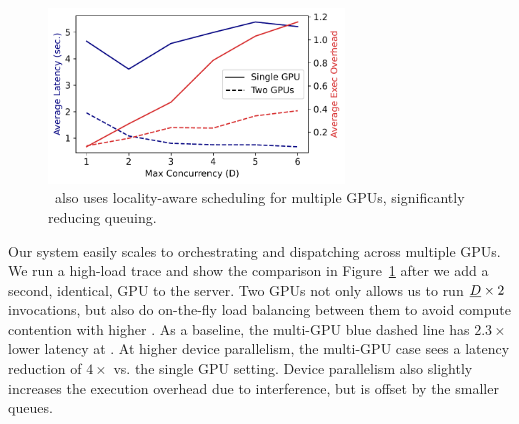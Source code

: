 \begin{figure}
  \centering  \includegraphics[width=0.7\textwidth]{./mqfq-final/graphs/multi-gpu/25.7/concurr_scale.pdf}
  \caption{\QName~also uses locality-aware scheduling for multiple GPUs, significantly reducing queuing.}
  \label{fig:multi-gpu}
\end{figure}

Our system easily scales to orchestrating and dispatching across multiple GPUs.
We run a high-load trace and show the comparison in Figure~\ref{fig:multi-gpu} after we add a second, identical, GPU to the server. 
Two GPUs not only allows us to run $\emph{D}\times2$ invocations, but also do on-the-fly load balancing between them to avoid compute contention with higher \D. 
As a baseline, the multi-GPU blue dashed line has $2.3\times$ lower latency at .
At higher device parallelism, the multi-GPU case sees a latency reduction of $4\times$ vs. the single GPU setting. 
Device parallelism also slightly increases the execution overhead due to interference, but is offset by the smaller queues. 




